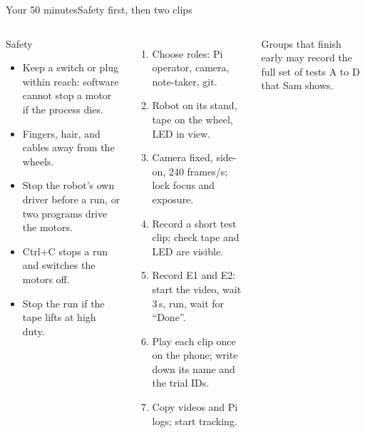 %
\begin{frame}{Your 50 minutes}{Safety first, then two clips}
  \label{app:fifty}
  \footnotesize
  \begin{columns}[T]
    \begin{alertblock}{\footnotesize Safety}
      \scriptsize
      \begin{itemize}\setlength{\itemsep}{1pt}
        \item Keep a switch or plug within reach: software cannot stop a motor if the process dies.
        \item Fingers, hair, and cables away from the wheels.
        \item Stop the robot's own driver before a run, or two programs drive the motors.
        \item Ctrl+C stops a run and switches the motors off.
        \item Stop the run if the tape lifts at high duty.
      \end{itemize}
    \end{alertblock}
    \scriptsize
    \begin{enumerate}\setlength{\itemsep}{1pt}
      \item Choose roles: Pi operator, camera, note-taker, git.
      \item Robot on its stand, tape on the wheel, LED in view.
      \item Camera fixed, side-on, 240 frames/s; \alert{lock focus and exposure}.
      \item Record a short test clip; check tape and LED are visible.
      \item Record E1 and E2: start the video, wait 3\,s, run, wait for ``Done''.
      \item Play each clip once on the phone; write down its name and the trial IDs.
      \item Copy videos and Pi logs; start tracking.
    \end{enumerate}
    \vspace{2pt}
    Groups that finish early may record the full set of tests A to D that Sam shows.
  \end{columns}
\end{frame}
